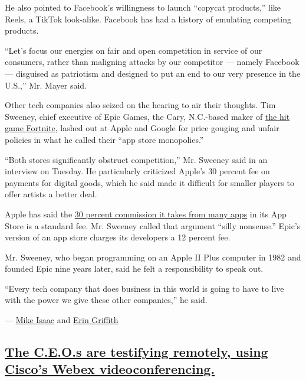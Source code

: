 He also pointed to Facebook's willingness to launch ``copycat
products,'' like Reels, a TikTok look-alike. Facebook has had a history
of emulating competing products.

``Let's focus our energies on fair and open competition in service of
our consumers, rather than maligning attacks by our competitor ---
namely Facebook --- disguised as patriotism and designed to put an end
to our very presence in the U.S.,'' Mr. Mayer said.

Other tech companies also seized on the hearing to air their thoughts.
Tim Sweeney, chief executive of Epic Games, the Cary, N.C.-based maker
of
\href{https://www.nytimes.com/2018/07/25/arts/what-is-fortnite-battle-royale-nyt.html}{the
hit game Fortnite}, lashed out at Apple and Google for price gouging and
unfair policies in what he called their ``app store monopolies.''

``Both stores significantly obstruct competition,'' Mr. Sweeney said in
an interview on Tuesday. He particularly criticized Apple's 30 percent
fee on payments for digital goods, which he said made it difficult for
smaller players to offer artists a better deal.

Apple has said the
\href{https://www.nytimes.com/2020/07/28/technology/apple-app-store-airbnb-classpass.html}{30
percent commission it takes from many apps} in its App Store is a
standard fee. Mr. Sweeney called that argument ``silly nonsense.''
Epic's version of an app store charges its developers a 12 percent fee.

Mr. Sweeney, who began programming on an Apple II Plus computer in 1982
and founded Epic nine years later, said he felt a responsibility to
speak out.

``Every tech company that does business in this world is going to have
to live with the power we give these other companies,'' he said.

--- \href{https://www.nytimes.com/by/mike-isaac}{Mike Isaac} and
\href{https://www.nytimes.com/by/erin-griffith}{Erin Griffith}

\hypertarget{the-ceos-are-testifying-remotely-using-ciscos-webex-videoconferencing}{%
\subsection{\texorpdfstring{\protect\hyperlink{the-ceos-are-testifying-remotely-using-ciscos-webex-videoconferencing}{The
C.E.O.s are testifying remotely, using Cisco's Webex
videoconferencing.}}{The C.E.O.s are testifying remotely, using Cisco's Webex videoconferencing.}}\label{the-ceos-are-testifying-remotely-using-ciscos-webex-videoconferencing}}

